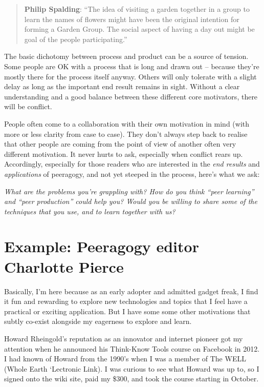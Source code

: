 \begin{quote}
\textbf{Philip Spalding}: ``The idea of visiting a garden together in a
group to learn the names of flowers might have been the original
intention for forming a Garden Group. The social aspect of having a day
out might be goal of the people participating.''
\end{quote}

The basic dichotomy between process and product can be a source of
tension. Some people are OK with a process that is long and drawn out --
because they're mostly there for the process itself anyway. Others will
only tolerate with a slight delay as long as the important end result
remains in sight. Without a clear understanding and a good balance
between these different core motivators, there will be conflict.

People often come to a collaboration with their own motivation in mind
(with more or less clarity from case to case). They don't always step
back to realise that other people are coming from the point of view of
another often very different motivation. It never hurts to ask,
especially when conflict rears up. Accordingly, especially for those
readers who are interested in the \emph{end results} and
\emph{applications} of peeragogy, and not yet steeped in the process,
here's what we ask:

\emph{What are the problems you're grappling with? How do you think
``peer learning'' and ``peer production'' could help you? Would you be
willing to share some of the techniques that you use, and to learn
together with us?}

\hypertarget{example-peeragogy-editor-charlotte-pierce}{%
\section{Example: Peeragogy editor Charlotte
Pierce}\label{example-peeragogy-editor-charlotte-pierce}}

Basically, I'm here because as an early adopter and admitted gadget
freak, I find it fun and rewarding to explore new technologies and
topics that I feel have a practical or exciting application. But I have
some some other motivations that subtly co-exist alongside my eagerness
to explore and learn.

Howard Rheingold's reputation as an innovator and internet pioneer got
my attention when he announced his Think-Know Tools course on Facebook
in 2012. I had known of Howard from the 1990's when I was a member of
The WELL (Whole Earth `Lectronic Link). I was curious to see what Howard
was up to, so I signed onto the wiki site, paid my \$300, and took the
course starting in October.

